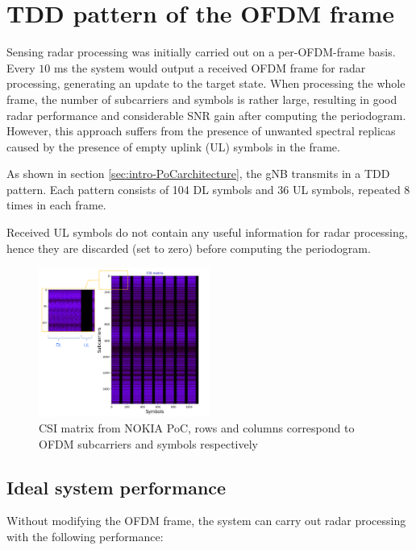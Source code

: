 \chapter{TDD pattern of the OFDM frame}
\label{chap:TDD pattern of the OFDM frame}


Sensing radar processing was initially carried out on a per-OFDM-frame basis. \protect\newline Every $10$ ms the system would output a received OFDM frame for radar processing, generating an update to the target state. When processing the whole frame, the number of subcarriers and symbols is rather large, resulting in good radar performance and considerable SNR gain after computing the periodogram. However, this approach suffers from the presence of unwanted spectral replicas caused by the presence of empty uplink (UL) symbols in the frame.
    
As shown in section \ref{sec:intro-PoCarchitecture}, the gNB transmits in a TDD pattern. Each pattern consists of 104 DL symbols and 36 UL symbols, repeated 8 times in each frame.

Received UL symbols do not contain any useful information for radar processing, hence they are discarded (set to zero) before computing the periodogram.

\begin{figure}[H]
    \centering
    \includegraphics[width=0.5\textwidth]{Images/TDDprocessing/CSIMatrix_DLULpattern.png}
    \caption{CSI matrix from NOKIA PoC, rows and columns correspond to OFDM subcarriers and symbols respectively}
    \label{fig:CSIMatrix_DLULpattern}
\end{figure}

\section{Ideal system performance}

Without modifying the OFDM frame, the system can carry out radar processing with the following performance:

